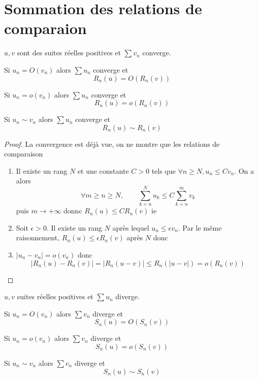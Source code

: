\section{Sommation des relations de comparaion}

\begin{thm}
    \Hyp $u, v$ sont des suites réelles positives et $\sum v_n$ converge.
    \begin{concenum}
    \item Si $u_n=O(v_n)$ alors $\sum u_n$ converge et \[
            R_n(u)=O(R_n(v))
        \]
    \item Si $u_n=o(v_n)$ alors $\sum u_n$ converge et \[
            R_n(u)=o(R_n(v))
        \]
    \item Si $u_n\sim v_n$ alors $\sum u_n$ converge et \[
            R_n(u)\sim R_n(v)
        \]
    \end{concenum}
\end{thm}

\begin{proof}
    La convergence est déjà vue, on ne montre que les relations de comparaison

    \begin{enumerate}
        \item Il existe un rang $N$ et une constante $C>0$ tels que $\forall n\geq N, u_n\leq Cv_n$. On a alors \[
    \forall m\geq n\geq N, \qquad \sum_{k=n}^Nu_k\leq C\sum_{k=n}^mv_k
            \]
            puis $m\to+\infty$ donnc $R_n(u)\leq CR_n(v)$ ie \conc
        \item Soit $\epsilon>0$. Il existe un rang $N$ après lequel $u_n\leq \epsilon v_n$. Par le même raisonnement, $R_n(u)\leq \epsilon R_n(v)$ après $N$ donc \conc
        \item $|u_n-v_n|=o(v_n)$ donc \[
                |R_n(u)-R_n(v)|=|R_n(u-v)|\leq R_n(|u-v|)=o(R_n(v))
            \]
    \end{enumerate}
\end{proof}

\begin{thm}
    \Hyp $u, v$ suites réelles positives et $\sum u_n$ diverge.
    \item Si $u_n=O(v_n)$ alors $\sum v_n$ diverge et \[
            S_n(u)=O(S_n(v))
        \]
    \item Si $u_n=o(v_n)$ alors $\sum v_n$ diverge et \[
            S_n(u)=o(S_n(v))
        \]
    \item Si $u_n\sim v_n$ alors $\sum v_n$ diverge et \[
            S_n(u)\sim S_n(v)
        \]
\end{thm}

